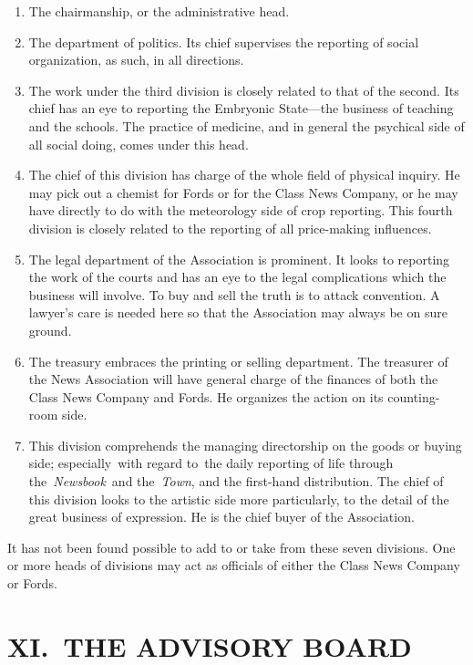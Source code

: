 \documentclass[openany,nobib]{tufte-book}
\begin{document}
\begin{enumerate}
\item
  The chairmanship, or the administrative head.~~
\item
  The department of politics. Its chief supervises the reporting of
  social organization, as such, in all directions.~
\item
  The work under the third division is closely related to that of the
  second. Its chief has an eye to reporting the Embryonic State---the
  business of teaching and the schools. The practice of medicine, and in
  general the psychical side of all social doing, comes under this
  head.~
\item
  The chief of this division has charge of the whole field of physical
  inquiry. He may pick out a chemist for Fords or for the Class News
  Company, or he may have directly to do with the meteorology side of
  crop reporting. This fourth division is closely related to the
  reporting of all price-making influences.~
\item
  The legal department of the Association is prominent. It looks to
  reporting the work of the courts and has an eye to the legal
  complications which the business will involve. To buy and sell the
  truth is to attack convention. A lawyer's care is needed here so that
  the Association may always be on sure ground.~
\item
  The treasury embraces the printing or selling department. The
  treasurer of the News Association will have general charge of the
  finances of both the Class News Company and Fords. He organizes the
  action on its counting-room side.~
\item
  This division comprehends the managing directorship on the goods or
  buying side; especially~with regard to~the daily reporting of life
  through the~\emph{Newsbook}~and the~\emph{Town}, and the first-hand
  distribution. The chief of this division looks to the artistic side
  more particularly, to the detail of the great business of expression.
  He is the chief buyer of the Association.~
\end{enumerate}

It has not been found possible to add to or take from these seven
divisions. One or more heads of divisions may act as officials of either
the Class News Company or Fords.~~

\hypertarget{xi-the-advisory-board}{%
\section{XI.~THE ADVISORY BOARD}\label{xi-the-advisory-board}}
\end{document}
